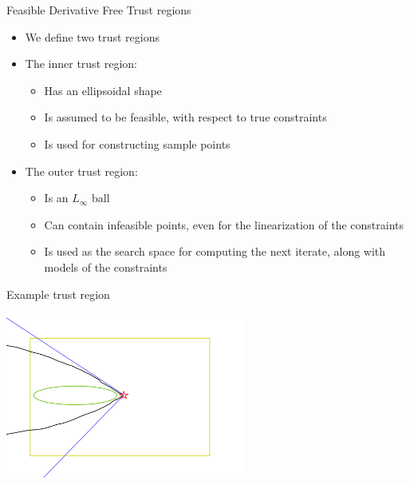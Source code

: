 \documentclass{beamer}
\begin{document}
\begin{frame}{Feasible Derivative Free Trust regions}
    \begin{itemize}
        \item We define two trust regions
        \item The inner trust region:
            \begin{itemize}
                \item Has an ellipsoidal shape
                \item Is assumed to be feasible, with respect to true constraints
                \item Is used for constructing sample points
            \end{itemize}
        \item The outer trust region:
            \begin{itemize}
                \item Is an $L_{\infty}$ ball
                \item Can contain infeasible points, even for the linearization of the constraints
                \item Is used as the search space for computing the next iterate, along with models of the constraints
            \end{itemize}
    \end{itemize}
\end{frame}


\begin{frame}{Example trust region}
\begin{center}
    \includegraphics[width=300px]{images/trust_regions.png}
\end{center}
\end{frame}
\end{document}
